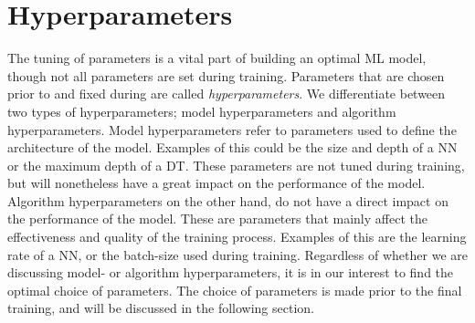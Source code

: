 \section{Hyperparameters}
The tuning of parameters is a vital part of building an optimal \ac{ML}
model, though not all parameters are set during training. Parameters 
that are chosen prior to and fixed during are called \emph{hyperparameters}. We differentiate
between two types of hyperparameters; model hyperparameters and algorithm 
hyperparameters. Model hyperparameters refer to parameters used to define the 
architecture of the model. Examples of this could be the size and depth of 
a \ac{NN} or the maximum depth of a \ac{DT}. These parameters are not tuned
during training, but will nonetheless have a great impact on the performance 
of the model. Algorithm hyperparameters on the other hand, do not have a direct impact 
on the performance of the model. These are parameters that mainly affect the 
effectiveness and quality of the training process. Examples of this are the 
learning rate of a \ac{NN}, or the batch-size used during training. Regardless 
of whether we are discussing model- or algorithm hyperparameters, it is in our interest
to find the optimal choice of parameters. The choice of parameters is made 
prior to the final training, and will be discussed in the following section.